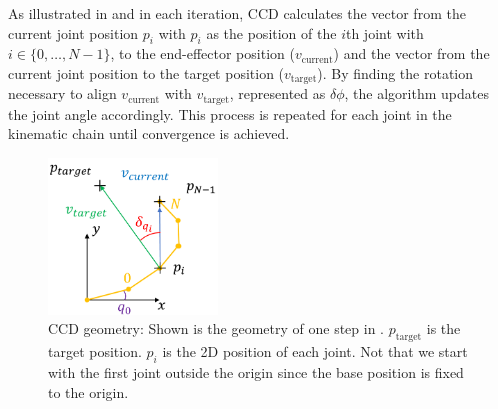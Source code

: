 As illustrated in  and  in each iteration, CCD calculates the vector from the current joint position $p_i$ with $p_i$ as the position of the $i$th joint with $i \in \{0, \ldots, N-1\}$, to the end-effector position ($v_\text{current}$) and the vector from the current joint position to the target position ($v_\text{target}$). By finding the rotation necessary to align $v_\text{current}$ with $v_\text{target}$, represented as $\delta\phi$, the algorithm updates the joint angle accordingly. This process is repeated for each joint in the kinematic chain until convergence is achieved.
\begin{figure}
	\centering
	\includegraphics[width=0.4\textwidth,]{figures/background/CCD_geometry.png}
	\caption[CCD geometry]{CCD geometry: Shown is the geometry of one step in . $p_\text{target}$ is the target position. $p_i$ is the 2D position of each joint. Not that we start with the first joint outside the origin since the base position is fixed to the origin.}
	\label{fig:background/CCD geometry}
\end{figure}

